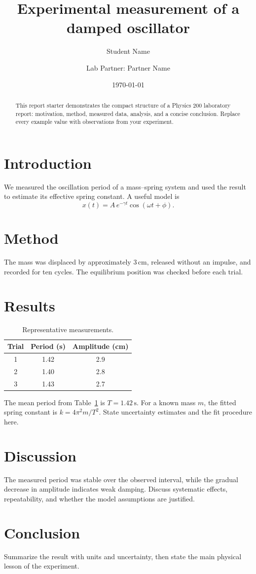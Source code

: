 \documentclass[aps,pre,twocolumn,nofootinbib]{revtex4}
\begin{document}
\title{Experimental measurement of a damped oscillator}
\author{Student Name}
\author{Lab Partner: Partner Name}
\date{\today}
\begin{abstract}
This report starter demonstrates the compact structure of a Physics 200
laboratory report: motivation, method, measured data, analysis, and a concise
conclusion. Replace every example value with observations from your experiment.
\end{abstract}
\maketitle
\section{Introduction}
We measured the oscillation period of a mass--spring system and used the result
to estimate its effective spring constant. A useful model is
\begin{equation}
  x(t)=A\,e^{-\gamma t}\cos(\omega t+\phi).
\end{equation}
\section{Method}
The mass was displaced by approximately \(3\,\mathrm{cm}\), released without
an impulse, and recorded for ten cycles. The equilibrium position was checked
before each trial.
\section{Results}
\begin{table}[b]
\caption{Representative measurements.}
\label{tab:measurements}
\begin{ruledtabular}
\begin{tabular}{ccc}
Trial & Period (s) & Amplitude (cm)\\
\hline
1 & 1.42 & 2.9\\
2 & 1.40 & 2.8\\
3 & 1.43 & 2.7
\end{tabular}
\end{ruledtabular}
\end{table}
The mean period from Table~\ref{tab:measurements} is \(T=1.42\,\mathrm{s}\).
For a known mass \(m\), the fitted spring constant is
\(k=4\pi^2m/T^2\). State uncertainty estimates and the fit procedure here.
\section{Discussion}
The measured period was stable over the observed interval, while the gradual
decrease in amplitude indicates weak damping. Discuss systematic effects,
repeatability, and whether the model assumptions are justified.
\section{Conclusion}
Summarize the result with units and uncertainty, then state the main physical
lesson of the experiment.
\end{document}
